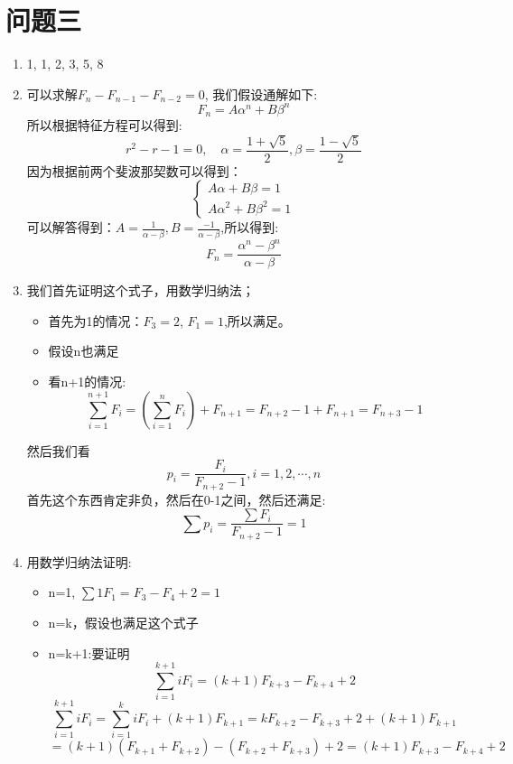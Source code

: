 \documentclass[answers]{exam}  %
\begin{document}
\section{问题三}
\begin{enumerate}[label=\alph*.] 
    \item 1, 1, 2, 3, 5, 8
    \item 可以求解$F_n - F_{n-1} - F_{n-2} = 0$, 我们假设通解如下:
    \[
        F_n= A\alpha^n + B\beta^n
    \]
    所以根据特征方程可以得到:
    \[
        r^2 - r - 1 =0, \quad \alpha = \frac{1+\sqrt{5}}{2} ,\beta = \frac{1 - \sqrt{5}}{2}
    \]
    因为根据前两个斐波那契数可以得到：
    \begin{equation*}
        \begin{cases*}
            A \alpha + B\beta = 1\\
            A \alpha^2 + B\beta^2 = 1
        \end{cases*}
    \end{equation*}
    可以解答得到：$A = \frac{1}{\alpha - \beta}, B = \frac{-1}{\alpha - \beta}$,所以得到:
    \[
        F_n = \frac{\alpha^n - \beta^n}{\alpha - \beta}
    \]
    \item 我们首先证明这个式子，用数学归纳法；
    \begin{itemize}
        \item 首先为1的情况：$F_3 = 2$, $F_1 = 1$,所以满足。
        \item 假设n也满足
        \item 看n+1的情况:
        \[
            \sum_{i=1}^{n+1} F_i = (\sum_{i=1}^{n} F_i) + F_{n+1} = F_{n+2} - 1 + F_{n+1} = F_{n+3} - 1
        \]
    \end{itemize}
    然后我们看
    \[
        p_i = \frac{F_i}{F_{n+2} - 1}, i=1,2,\cdots, n
    \]
    首先这个东西肯定非负，然后在0-1之间，然后还满足:
    \[
        \sum p_i = \frac{\sum F_i}{F_{n+2} -1} = 1
    \]
    \item 用数学归纳法证明:
    \begin{itemize}
        \item n=1, $\sum 1F_1 = F_3 - F_4 + 2 = 1$
        \item n=k，假设也满足这个式子
        \item n=k+1:要证明  
        \[
            \sum_{i=1}^{k+1} iF_i = (k+1)F_{k+3} - F_{k+4} + 2
        \]
        \[
            \sum_{i=1}^{k+1} iF_i = \sum_{i=1}^{k} iF_i + (k+1)F_{k+1} = kF_{k+2} - F_{k+3} + 2 + (k+1)F_{k+1}
        \]
        \[
            = (k+1)(F_{k+1}+F_{k+2}) - (F_{k+2} +F_{k+3}) + 2 = (k+1)F_{k+3} - F_{k+4} + 2
\]
\end{itemize}
\end{enumerate}
\end{document}
